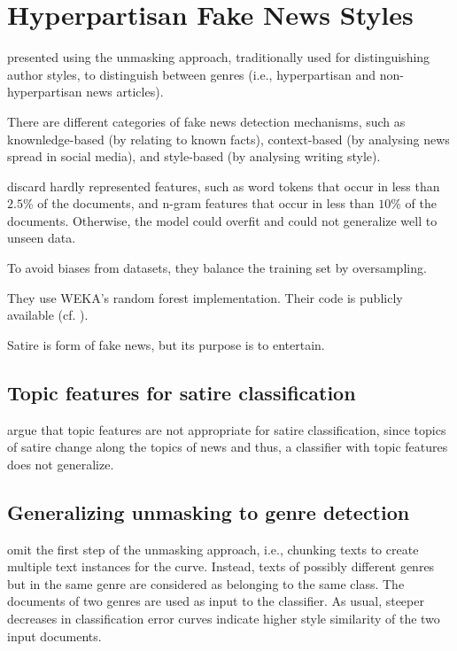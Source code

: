 \section{Hyperpartisan Fake News Styles}
\label{sec:hyperpartisan_fake_news_styles}

\citet{potthast_stylometric_2018} presented using the unmasking approach, traditionally used for distinguishing author styles, 
to distinguish between genres (i.e., hyperpartisan and non-hyperpartisan news articles). 

There are different categories of fake news detection mechanisms, such as knownledge-based (by relating to known facts), 
context-based (by analysing news spread in social media), and style-based (by analysing writing style).

\citet{potthast_stylometric_2018} discard hardly represented features, such as word tokens that occur in less than $2.5 \%$ of the documents, 
and n-gram features that occur in less than $10 \%$ of the documents.
Otherwise, the model could overfit and could not generalize well to unseen data.

To avoid biases from datasets, they balance the training set by oversampling.

They use WEKA's random forest implementation.
Their code is publicly available (cf. \cite{potthast_stylometric_2018}). 

Satire is form of fake news, but its purpose is to entertain.

\subsection{Topic features for satire classification}
\label{sec:topic_features_for_sarcasm_classification}

\citet{potthast_stylometric_2018} argue that topic features are not appropriate for satire classification, 
since topics of satire change along the topics of news and thus, a classifier with topic features does not generalize.

\subsection{Generalizing unmasking to genre detection}
\label{sec:generalizing_unmasking_to_genre_detection}

\citet{potthast_stylometric_2018} omit the first step of the unmasking approach, i.e., chunking texts to create multiple text instances for the curve.
Instead, texts of possibly different genres but in the same genre are considered as belonging to the same class.
The documents of two genres are used as input to the classifier.
As usual, steeper decreases in classification error curves indicate higher style similarity of the two input documents.